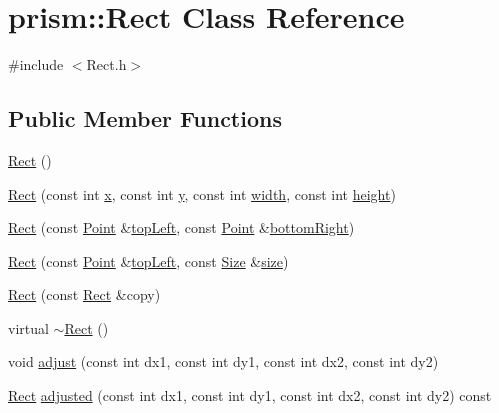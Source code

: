 \hypertarget{classprism_1_1_rect}{}\section{prism\+:\+:Rect Class Reference}
\label{classprism_1_1_rect}


{\ttfamily \#include $<$Rect.\+h$>$}

\subsection*{Public Member Functions}
\begin{DoxyCompactItemize}
\item 
\hyperlink{classprism_1_1_rect_af61646ec28b099ffe1b4901ae5639662}{Rect} ()
\item 
\hyperlink{classprism_1_1_rect_a80055d4dfd1f9feb803a4419cd43671d}{Rect} (const int \hyperlink{classprism_1_1_rect_a202fa9a56964c9111a968fb9b420f5f4}{x}, const int \hyperlink{classprism_1_1_rect_a6e951744e0bba0fed781b86ab0be680b}{y}, const int \hyperlink{classprism_1_1_rect_a8dae47a50fdac7a5f7e8aabef68437aa}{width}, const int \hyperlink{classprism_1_1_rect_ad713f4536accdc6d5d2e6a6d83eac78b}{height})
\item 
\hyperlink{classprism_1_1_rect_a62e6eaa2eba9506e830bd6f3ff817bca}{Rect} (const \hyperlink{classprism_1_1_point}{Point} \&\hyperlink{classprism_1_1_rect_a2900a6e837124886d2e6aa500fba5bde}{top\+Left}, const \hyperlink{classprism_1_1_point}{Point} \&\hyperlink{classprism_1_1_rect_a97eb5a66441a49c7e149229376aba6a0}{bottom\+Right})
\item 
\hyperlink{classprism_1_1_rect_afda4a2a6cc3bdfd2e4e213813f6d0653}{Rect} (const \hyperlink{classprism_1_1_point}{Point} \&\hyperlink{classprism_1_1_rect_a2900a6e837124886d2e6aa500fba5bde}{top\+Left}, const \hyperlink{classprism_1_1_size}{Size} \&\hyperlink{classprism_1_1_rect_adcbe6d279ad57294c88d287057867a2b}{size})
\item 
\hyperlink{classprism_1_1_rect_a03f9f2832b8f325ded900d85b2d12ea3}{Rect} (const \hyperlink{classprism_1_1_rect}{Rect} \&copy)
\item 
virtual \hyperlink{classprism_1_1_rect_acf86bebcd76de609a3619b063de6a7fe}{$\sim$\+Rect} ()
\item 
void \hyperlink{classprism_1_1_rect_a8bbcfbe99d39f7350dc7801ed5cf6d48}{adjust} (const int dx1, const int dy1, const int dx2, const int dy2)
\item 
\hyperlink{classprism_1_1_rect}{Rect} \hyperlink{classprism_1_1_rect_aa0101c79f105eb2b988d3814e00be511}{adjusted} (const int dx1, const int dy1, const int dx2, const int dy2) const 

\end{DoxyCompactItemize}
